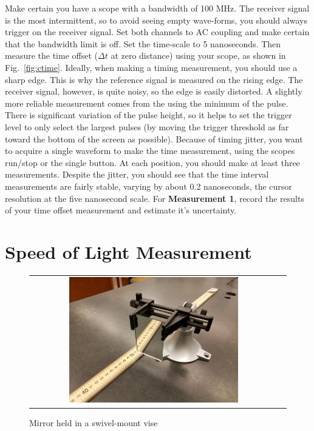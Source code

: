 Make certain you have a scope with a bandwidth of 100 MHz.  The
receiver signal is the most intermittent, so to avoid seeing empty
wave-forms, you should always trigger on the receiver signal.  Set
both channels to AC coupling and make certain that the bandwidth limit
is off.  Set the time-scale to 5 nanoseconds.  Then measure the time
offset ($\Delta t$ at zero distance) using your scope, as shown in
Fig.~\ref{fig:ctime}.  Ideally, when making a timing measurement, you
should use a sharp edge.  This is why the reference signal is measured
on the rising edge.  The receiver signal, however, is quite noisy, so
the edge is easily distorted.  A slightly more reliable measurement
comes from the using the minimum of the pulse.  There is significant
variation of the pulse height, so it helps to set the trigger level to
only select the largest pulses (by moving the trigger threshold as far
toward the bottom of the screen as possible).  Because of timing
jitter, you want to acquire a single waveform to make the time
measurement, using the scopes run/stop or the single button.  At each
position, you should make at least three measurements.  Despite the
jitter, you should see that the time interval measurements are fairly
stable, varying by about 0.2 nanoseconds, the cursor resolution at the
five nanosecond scale.  For {\bf Measurement 1}, record the results of
your time offset measurement and estimate it's uncertainty.

\section{Speed of Light Measurement}

\begin{figure}[htbp]
\begin{center}
\begin{tabular}{cc}
\includegraphics[width=0.7\textwidth]{figs/labs/c_air/mirror.jpg}
\end{tabular}
\end{center}
\caption{\label{fig:mirror} Mirror held in a swivel-mount vise}
\end{figure}

